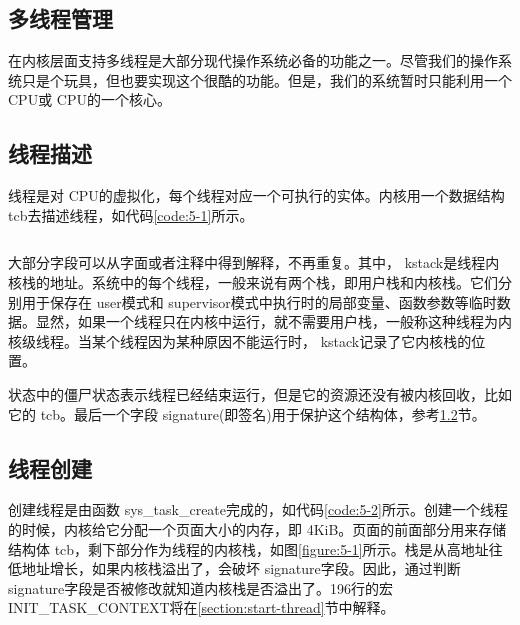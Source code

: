 \documentclass[main.tex]{subfiles}
\begin{document}
\ifxetex\else\begin{CJK*}{UTF8}{song}\fi

\chapter{多线程管理}
在内核层面支持多线程是大部分现代操作系统必备的功能之一。尽管我们的操作系统只是个玩具，但也要实现这个很酷的功能。但是，我们的系统暂时只能利用一个 CPU或 CPU的一个核心。

\section{线程描述}
线程是对 CPU的虚拟化，每个线程对应一个可执行的实体。内核用一个数据结构 tcb去描述线程，如代码\ref{code:5-1}所示。

\begin{code}
\label{code:5-1}
\inputminted[firstline=89,lastline=108,linenos,numbersep=5pt,frame=lines,framesep=2mm]{c}{src/chapter05/kernel/kernel.h}
\end{code}

大部分字段可以从字面或者注释中得到解释，不再重复。其中， kstack是线程内核栈的地址。系统中的每个线程，一般来说有两个栈，即用户栈和内核栈。它们分别用于保存在 user模式和 supervisor模式中执行时的局部变量、函数参数等临时数据。显然，如果一个线程只在内核中运行，就不需要用户栈，一般称这种线程为内核级线程。当某个线程因为某种原因不能运行时， kstack记录了它内核栈的位置。

\par
状态中的僵尸状态表示线程已经结束运行，但是它的资源还没有被内核回收，比如它的 tcb。最后一个字段 signature(即签名)用于保护这个结构体，参考\ref{section:create-thread}节。

\section{线程创建}
\label{section:create-thread}
创建线程是由函数 sys\_\-task\_\-create完成的，如代码\ref{code:5-2}所示。创建一个线程的时候，内核给它分配一个页面大小的内存，即 4KiB。页面的前面部分用来存储结构体 tcb，剩下部分作为线程的内核栈，如图\ref{figure:5-1}所示。栈是从高地址往低地址增长，如果内核栈溢出了，会破坏 signature字段。因此，通过判断 signature字段是否被修改就知道内核栈是否溢出了。196行的宏 INIT\_\-TASK\_\-CONTEXT将在\ref{section:start-thread}节中解释。


\end{CJK*}
\end{document}
